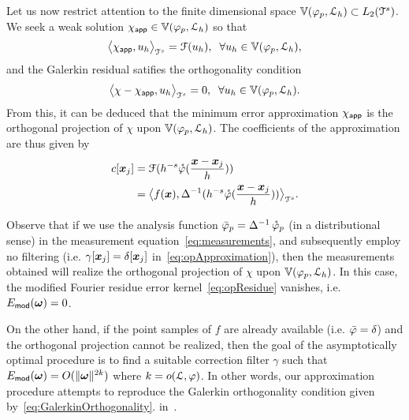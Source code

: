 Let us now restrict attention to the finite dimensional space
$\aspace{\lattice{L}_h}{\varphi_p} \subset L_2(\cube^s)$. We seek a
weak solution $\appf{\chi} \in \aspace{\lattice{L}_h}{\varphi_p}$ so that
\begin{equation}
  \innerproduct{\appf{\chi}}{u_h} = \mathcal{F}(u_h), \;\;
  \forall u_h \in \aspace{\lattice{L}_h}{\varphi_p},
\end{equation}
and the Galerkin residual satifies the orthogonality condition
\begin{equation}
  \innerproduct{\chi - \appf{\chi}}{u_h} = 0, \;\;
  \forall u_h \in \aspace{\lattice{L}_h}{\varphi_p}.
  \label{eq:GalerkinOrthogonality}
\end{equation}
From this, it can be deduced that the minimum error approximation $\appf{\chi}$ is the orthogonal projection of $\chi$ upon $\aspace{\lattice{L}_h}{\varphi_p}$. The coefficients of the approximation are thus given by
\begin{equation}
  \begin{split}
    c[\vect{x}_j] & = \mathcal{F}(h^{-s}
    \dual{\varphi}(\frac{\vect{x}-\vect{x}_j}{h})) \\
    & = 
    \innerproduct{f(\vect{x})}{\invlaplacian(h^{-s}\dual{\varphi}(\frac{\vect{x}-\vect{x}_j}{h}))}.
  \end{split}
\end{equation}

Observe that if we use the analysis function $\analysis{\varphi}_p = \invlaplacian \dual{\varphi}_p$ (in a distributional sense) in the measurement equation~\eqref{eq:measurements}, and subsequently employ no filtering (i.e. $\gamma[\vect{x}_j] = \delta[\vect{x}_j]$ in~\eqref{eq:opApproximation}), then the measurements obtained will realize the orthogonal projection of $\chi$ upon $\aspace{\lattice{L}_h}{\varphi_p}$. In this case, the modified Fourier residue error kernel~\eqref{eq:opResidue} vanishes, i.e. $E_{\mathsf{mod}}(\vect{\omega}) = 0$.

On the other hand, if the point samples of $f$ are already available (i.e. $\analysis{\varphi} = \delta$) and the orthogonal projection cannot be realized, then the goal of the asymptotically optimal
procedure is to find a suitable correction filter $\gamma$ such that $E_{\mathsf{mod}}(\vect{\omega}) = O(\norm{\vect{\omega}}^{2k})$ where $k = \order{\lattice{L}}{\varphi}$.  
In other words, our approximation procedure attempts to reproduce the Galerkin orthogonality condition given by~\eqref{eq:GalerkinOrthogonality}. %
in~.

